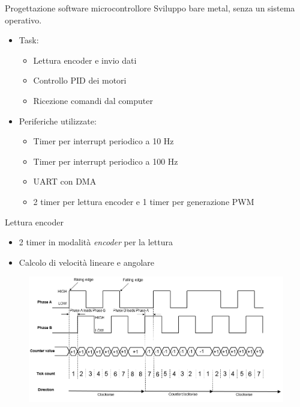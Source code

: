 \documentclass{beamer}
\begin{document}
\begin{tframe}{Progettazione software microcontrollore}
Sviluppo bare metal, senza un sistema operativo.
\begin{itemize}
    \item Task:
        \begin{itemize}
            \item Lettura encoder e invio dati
            \item Controllo PID dei motori
            \item Ricezione comandi dal computer
        \end{itemize}
    \item Periferiche utilizzate:
        \begin{itemize}
            \item Timer per interrupt periodico a 10 Hz
            \item Timer per interrupt periodico a 100 Hz
            \item UART con DMA
            \item 2 timer per lettura encoder e 1 timer per generazione PWM
        \end{itemize}
\end{itemize}

\end{tframe}

\begin{tframe}{Lettura encoder}
\begin{itemize}
    \item 2 timer in modalità \textit{encoder} per la lettura
    \item Calcolo di velocità lineare e angolare
\end{itemize}
\begin{figure}
    \centering
    \includegraphics[width=0.9\columnwidth]{img/x4_encoder.png}
\end{figure}

\end{tframe}
\end{document}
